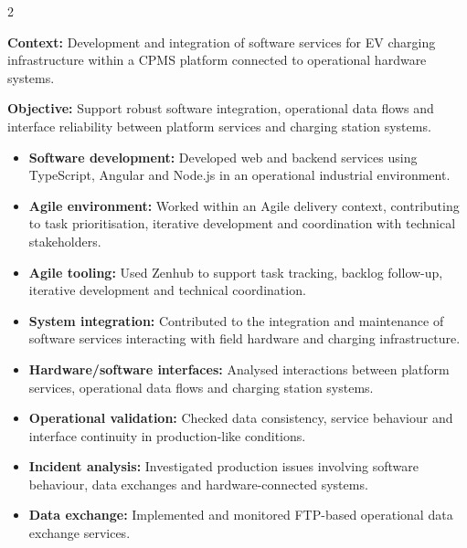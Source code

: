 \documentclass[8pt,a4paper,ragged2e,withhyper]{altacv}
\begin{document}



\makecvheader
\vspace{-0.3cm}


\begin{paracol}{2}



\textbf{Context:} Development and integration of software services for EV charging infrastructure within a CPMS platform connected to operational hardware systems.

\textbf{Objective:} Support robust software integration, operational data flows and interface reliability between platform services and charging station systems.

\begin{itemize}
  \item \textbf{Software development:} Developed web and backend services using TypeScript, Angular and Node.js in an operational industrial environment.
  \item \textbf{Agile environment:} Worked within an Agile delivery context, contributing to task prioritisation, iterative development and coordination with technical stakeholders.
  \item \textbf{Agile tooling:} Used Zenhub to support task tracking, backlog follow-up, iterative development and technical coordination.
  \item \textbf{System integration:} Contributed to the integration and maintenance of software services interacting with field hardware and charging infrastructure.
  \item \textbf{Hardware/software interfaces:} Analysed interactions between platform services, operational data flows and charging station systems.
  \item \textbf{Operational validation:} Checked data consistency, service behaviour and interface continuity in production-like conditions.
  \item \textbf{Incident analysis:} Investigated production issues involving software behaviour, data exchanges and hardware-connected systems.
  \item \textbf{Data exchange:} Implemented and monitored FTP-based operational data exchange services.
\end{itemize}


\end{paracol}
\end{document}
